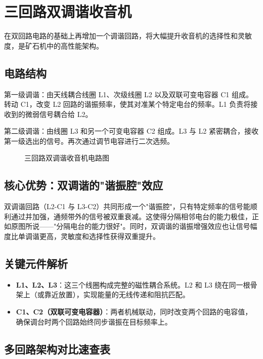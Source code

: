 \documentclass[12pt,UTF8]{ctexbook}
\begin{document}
\section{三回路双调谐收音机}

在双回路电路的基础上再增加一个调谐回路，将大幅提升收音机的选择性和灵敏度，是矿石机中的高性能架构。

\subsection{电路结构}

第一级调谐：由天线耦合线圈 L1、次级线圈 L2 以及双联可变电容器 C1 组成。转动 C1，改变 L2 回路的谐振频率，使其对准某个特定电台的频率。L1 负责将接收到的微弱信号耦合给 L2。

第二级调谐：由线圈 L3 和另一个可变电容器 C2 组成。L3 与 L2 紧密耦合，接收第一级选出的信号。再次通过调节电容进行二次选频。

\begin{figure}[H]
	\centering
	\caption{三回路双调谐收音机电路图}
	\label{fig:triple-loop-circuit}
\end{figure}

\subsection{核心优势：双调谐的"谐振腔"效应}

双调谐回路（L2-C1 与 L3-C2）共同形成一个"谐振腔"，只有特定频率的信号能顺利通过并加强，通频带外的信号被双重衰减。这使得分隔相邻电台的能力极佳，正如原图所说——"分隔电台的能力很好"。同时，双调谐的谐振增强效应也让信号幅度比单调谐更高，灵敏度和选择性获得双重提升。

\subsection{关键元件解析}

\begin{itemize}[leftmargin=2cm]
	\item \textbf{L1、L2、L3}：这三个线圈构成完整的磁性耦合系统。L2 和 L3 绕在同一根骨架上（或靠近放置），实现能量的无线传递和阻抗匹配。
	\item \textbf{C1、C2（双联可变电容器）}：两者机械联动，同时改变两个回路的电容值，确保调台时两个回路始终同步谐振在目标频率上。
\end{itemize}

\subsection{多回路架构对比速查表}
\end{document}
